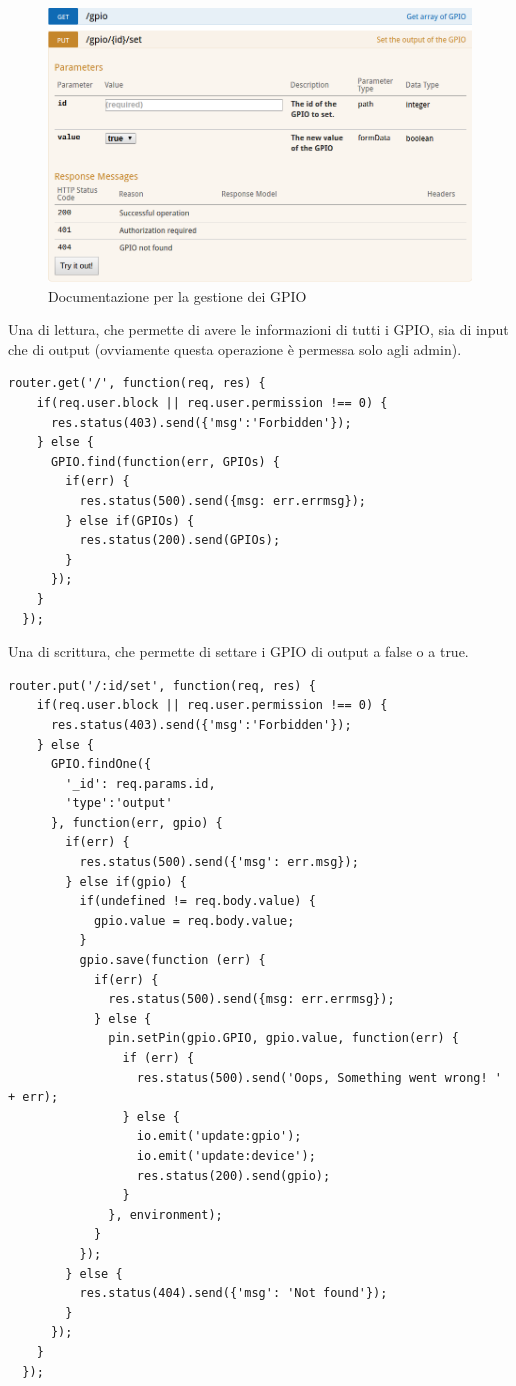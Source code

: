 \begin{figure}[h]
\centering
\includegraphics[width=1\textwidth]{API/gpio.png} 
\caption{Documentazione per la gestione dei GPIO}
\label{fig:user:login}
\end{figure}

Una di lettura, che permette di avere le informazioni di tutti i GPIO, sia di input che di output
(ovviamente questa operazione è permessa solo agli admin).

\begin{lstlisting}[caption={/webserver/app/routes/gpio.js get}, style=javaScriptCode]
  router.get('/', function(req, res) {
    if(req.user.block || req.user.permission !== 0) {
      res.status(403).send({'msg':'Forbidden'});
    } else {
      GPIO.find(function(err, GPIOs) {
        if(err) {
          res.status(500).send({msg: err.errmsg});
        } else if(GPIOs) {
          res.status(200).send(GPIOs);
        }
      });
    }
  });
\end{lstlisting}

Una di scrittura, che permette di settare i GPIO di output a false o a true.

\begin{lstlisting}[caption={/webserver/app/routes/gpio.js set}, style=javaScriptCode]
  router.put('/:id/set', function(req, res) {
    if(req.user.block || req.user.permission !== 0) {
      res.status(403).send({'msg':'Forbidden'});
    } else {
      GPIO.findOne({
        '_id': req.params.id,
        'type':'output'
      }, function(err, gpio) {
        if(err) {
          res.status(500).send({'msg': err.msg});
        } else if(gpio) {
          if(undefined != req.body.value) {
            gpio.value = req.body.value;
          }
          gpio.save(function (err) {
            if(err) {
              res.status(500).send({msg: err.errmsg});
            } else {
              pin.setPin(gpio.GPIO, gpio.value, function(err) {
                if (err) {
                  res.status(500).send('Oops, Something went wrong! ' + err);
                } else {
                  io.emit('update:gpio');
                  io.emit('update:device');
                  res.status(200).send(gpio);
                }
              }, environment);
            }
          });
        } else {
          res.status(404).send({'msg': 'Not found'});
        }
      });
    }
  });
\end{lstlisting}

